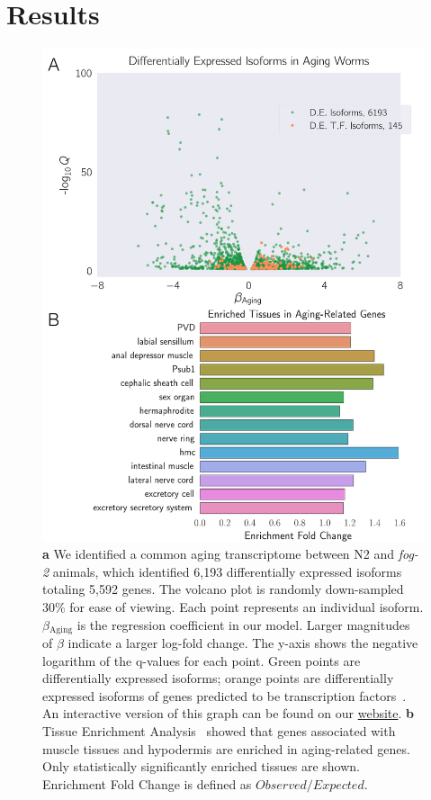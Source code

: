 \documentclass[10pt,letterpaper,twocolumn]{article}
\newcommand{\fog}{\emph{\mbox{fog-2}}}
\newcommand{\agen}{5,592}
\newcommand{\webref}{
\href{https://wormlabcaltech.github.io/Angeles_Leighton_2016/}{website}}
\begin{document}
\section*{Results}
\label{sec:results}
\begin{figure}[htbp]
\renewcommand{\familydefault}{\sfdefault}\normalfont{}
\centering
\includegraphics[width=\linewidth]{../output/figs/final_figs/aging_transcriptomics.pdf}
\caption{\textbf{a} We identified a common aging transcriptome between N2 and \fog{} animals, which identified 6,193 differentially expressed isoforms totaling \agen{} genes. The volcano plot is randomly down-sampled 30\% for ease of viewing. Each point represents an individual isoform. $\beta{}_\mathrm{Aging}$ is the regression coefficient in our model. Larger magnitudes of $\beta$ indicate a larger log-fold change. The y-axis shows the negative logarithm of the q-values for each point. Green points are differentially expressed isoforms; orange points are differentially expressed isoforms of genes predicted to be transcription factors~\cite{Reece-Hoyes2005}. An interactive version of this graph can be found on our \webref{}. \textbf{b} Tissue Enrichment Analysis~\cite{Angeles-Albores2016} showed that genes associated with muscle tissues and hypodermis are enriched in aging-related genes.
Only statistically significantly enriched tissues are shown. Enrichment Fold Change is defined as $Observed/Expected$.
}
\label{fig:agingtranscriptome}
\end{figure}
\end{document}
